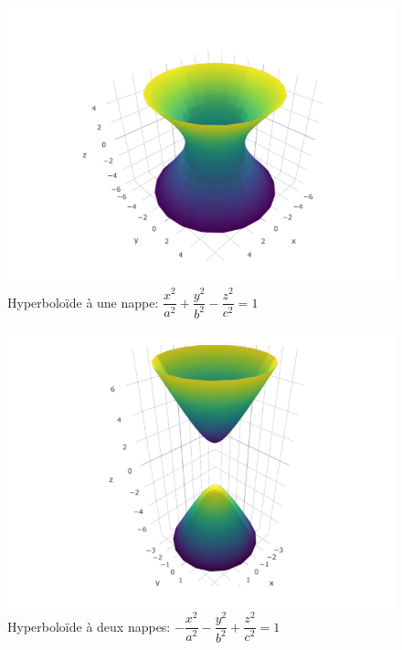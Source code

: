 \documentclass[]{book}
\theoremstyle{definition}
\theoremstyle{definition}
\theoremstyle{definition}
\theoremstyle{remark}
\begin{document}
\begin{figure}

{\centering \includegraphics[width=0.8\linewidth]{resources/images/hyper1nappe} 

}

\caption{Hyperboloïde à une nappe: $\dfrac{x^2}{a^2}+\dfrac{y^2}{b^2}-\dfrac{z^2}{c^2}=1$}\label{fig:hyper1nappe}
\end{figure}

\begin{figure}

{\centering \includegraphics[width=0.8\linewidth]{resources/images/hyper2nappe} 

}

\caption{Hyperboloïde à deux nappes: $-\dfrac{x^2}{a^2}-\dfrac{y^2}{b^2}+\dfrac{z^2}{c^2}=1$}\label{fig:hyper2nappe}
\end{figure}
\end{document}
